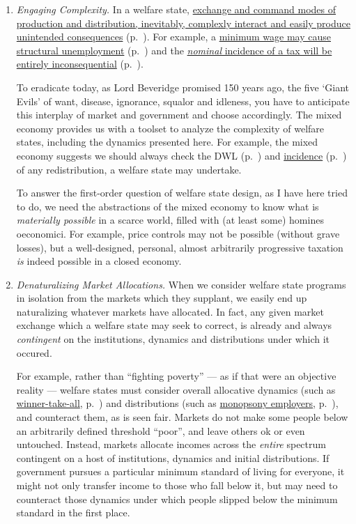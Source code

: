 \begin{enumerate}
	\item \emph{Engaging Complexity.} In a welfare state, \hyperref[sec:interface]{exchange and command modes of production and distribution, inevitably, complexly interact and easily produce unintended consequences} (p.~\pageref{sec:interface}).
For example, a \hyperref[sec:prince-controls]{minimum wage may cause structural unemployment} (p.~\pageref{sec:price-controls}) and the \hyperref[sec:well-determined-incidence]{\emph{nominal} incidence of a tax will be entirely inconsequential} (p.~\pageref{sec:well-determined-incidence}).

	To eradicate today, as Lord Beveridge promised 150 years ago, the five `Giant Evils' of want, disease, ignorance, squalor and idleness, you have to anticipate this interplay of market and government and choose accordingly.
The mixed economy provides us with a toolset to analyze the complexity of welfare states, including the dynamics presented here.
For example, the mixed economy suggests we should always check the \gls{DWL} (p.~\pageref{sec:minimal-DWL}) and \hyperref[sec:well-determined-incidence]{incidence} (p.~\pageref{sec:well-determined-incidence}) of any redistribution, a welfare state may undertake.

	To answer the first-order question of welfare state design, as I have here tried to do, we need the abstractions of the mixed economy to know what is \emph{materially possible} in a scarce world, filled with (at least some) homines oeconomici.
For example, price controls may not be possible (without grave losses), but a well-designed, personal, almost arbitrarily progressive taxation \emph{is} indeed possible in a closed economy.

	\item \emph{Denaturalizing Market Allocations.} When we consider welfare state programs in isolation from the markets which they supplant, we easily end up naturalizing whatever markets have allocated.
In fact, any given market exchange which a welfare state may seek to correct, is already and always \emph{contingent} on the institutions, dynamics and distributions under which it occured.

	For example, rather than ``fighting poverty'' --- as if that were an objective reality --- welfare states must consider overall allocative dynamics (such as \hyperref[sec:winner-take-all]{winner-take-all}, p.~\pageref{sec:winner-take-all}) and distributions (such as \hyperref[sec:monopsony-employers]{monopsony employers}, p.~\pageref{sec:monopsony-employers}), and counteract them, as is seen fair.
Markets do not make some people below an arbitrarily defined threshold ``poor'', and leave others ok or even untouched.
Instead, markets allocate incomes across the \emph{entire} spectrum contingent on a host of institutions, dynamics and initial distributions.
If government pursues a particular minimum standard of living for everyone, it might not only transfer income to those who fall below it, but may need to counteract those dynamics under which people slipped below the minimum standard in the first place.


\end{enumerate}
